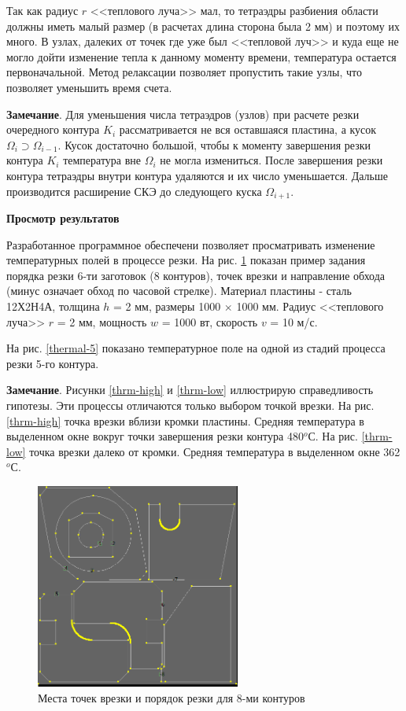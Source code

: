 \documentclass[11pt,twoside]{report}
\begin{document}
Так как радиус  $r$
<<теплового луча>> мал,
то тетраэдры разбиения области должны иметь малый размер
(в расчетах длина сторона была  2 мм)
и поэтому их много.
В узлах, далеких от точек где уже был <<тепловой луч>>
и куда еще не могло дойти изменение тепла к данному моменту времени,
температура остается первоначальной.
Метод релаксации позволяет пропустить такие узлы,
что позволяет уменьшить время счета.

{\bf Замечание}.
Для уменьшения числа тетраэдров (узлов)
при расчете резки очередного контура
$K_i$
рассматривается не вся оставшаяся пластина, а кусок
$\Omega_i \supset \Omega_{i-1}$.
Кусок  достаточно большой,
чтобы к моменту завершения резки контура
$K_i$
температура вне
$\Omega_i$
не могла измениться.
После завершения резки контура
тетраэдры внутри контура удаляются и их число уменьшается.
Дальше производится расширение СКЭ до следующего куска
$\Omega_{i+1}$.

{\bf Просмотр результатов}

Разработанное программное обеспечени
позволяет просматривать изменение температурных полей
в процессе резки.
На рис. \ref{thermal-plan}
показан пример задания порядка резки
6-ти заготовок (8 контуров),
точек врезки и направление обхода
(минус означает обход по часовой стрелке).
Материал пластины -  сталь 12Х2Н4А,
толщина $h$ = 2 мм, размеры 1000 $\times$ 1000 мм.
Радиус <<теплового луча>> $r$ = 2 мм,
мощность $w$ = 1000 вт,
скорость $v$ = 10 м/с.

На рис. \ref{thermal-5} показано температурное поле
на одной из стадий процесса резки 5-го контура.

{\bf Замечание}.
Рисунки \ref{thrm-high} и \ref{thrm-low}  иллюстрирую справедливость гипотезы.
Эти процессы отличаются только выбором точкой врезки.
На рис. \ref{thrm-high} точка врезки вблизи кромки пластины.
Средняя температура в выделенном окне
вокруг точки завершения резки контура 480$^o$С.
На рис. \ref{thrm-low} точка врезки далеко от кромки.
Средняя температура в выделенном окне  362$^o$С.

\begin{figure}
  \centering
  \includegraphics[width=0.6\textwidth]{thermal-plan.png}
  \caption{Места точек врезки и порядок резки для 8-ми контуров}
  \label{thermal-plan}
\end{figure}
\end{document}
